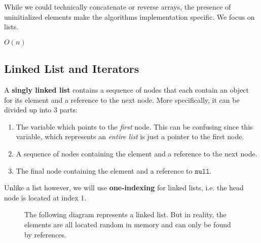   While we could technically concatenate or reverse arrays, the presence of uninitialized elements make the algorithms implementation specific. We focus on lists. 

  \begin{algo}
    
  \end{algo}

  \begin{algo}
    $O(n)$
  \end{algo}

\subsection{Linked List and Iterators}

  \begin{definition}
    A \textbf{singly linked list} contains a sequence of nodes that each contain an object for its element and a reference to the next node. More specifically, it can be divided up into 3 parts: 
    \begin{enumerate}
      \item The variable which points to the \textit{first} node. This can be confusing since this variable, which represents an \textit{entire list} is just a pointer to the first node. 
      \item A sequence of nodes containing the element and a reference to the next node. 
      \item The final node containing the element and a reference to $\texttt{null}$. 
    \end{enumerate}
    Unlike a list however, we will use \textbf{one-indexing} for linked lists, i.e. the head node is located at index $1$. 

    \begin{figure}[H]
      \centering 
      \caption{The following diagram represents a linked list. But in reality, the elements are all located random in memory and can only be found by references. } 
      \label{fig:linked_list}
    \end{figure}
  \end{definition}


